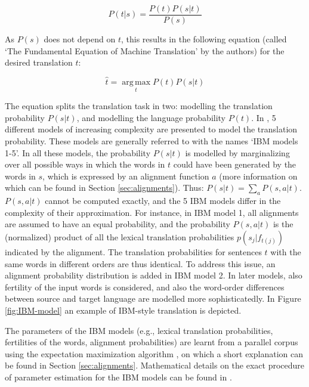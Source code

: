 \[
P(t|s) = \frac{P(t)P(s|t)}{P(s)}
\]

As $P(s)$ does not depend on $t$, this results in the following equation (called `The Fundamental Equation of Machine Translation' by the authors) for the desired translation $\hat{t}$:

\[
\hat{t} = \operatorname*{arg\,max}_t P(t)P(s|t)
\]

The equation splits the translation task in two: modelling the translation probability $P(s|t)$, and modelling the language probability $P(t)$. In \cite{brown1993mathematics}, 5 different models of increasing complexity are presented to model the translation probability. These models are generally referred to with the names `IBM models 1-5'. In all these models, the probability $P(s|t)$ is modelled by marginalizing over all possible ways in which the words in $t$ could have been generated by the words in $s$, which is expressed by an alignment function $a$ (more information on which can be found in Section \ref{sec:alignments}). Thus: $P(s|t) = \sum_a P(s,a|t)$. $P(s,a|t)$ cannot be computed exactly, and the 5 IBM models differ in the complexity of their approximation. For instance, in IBM model 1, all alignments are assumed to have an equal probability, and the probability $P(s,a|t)$ is the (normalized) product of all the lexical translation probabilities $p(s_j|f_{t(j)})$ indicated by the alignment. The translation probabilities for sentences $t$ with the same words in different orders are thus identical. To address this issue, an alignment probability distribution is added in IBM model 2. In later models, also fertility of the input words is considered, and also the word-order differences between source and target language are modelled more sophisticatedly. In Figure \ref{fig:IBM-model} an example of IBM-style translation is depicted. 

The parameters of the IBM models (e.g., lexical translation probabilities, fertilities of the words, alignment probabilities) are learnt from a parallel corpus using the expectation maximization algorithm \citep{dempster1977maximum}, on which a short explanation can be found in Section \ref{sec:alignments}. Mathematical details on the exact procedure of parameter estimation for the IBM models can be found in \cite{brown1993mathematics}.

